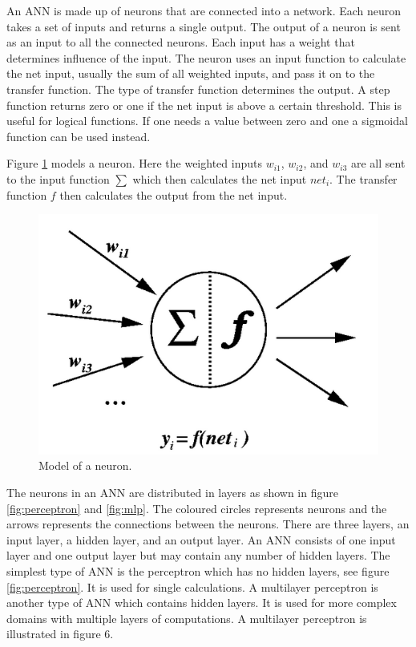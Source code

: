 An ANN is made up of neurons that are connected into a network. Each neuron takes a set of inputs and returns a single output. The output of a neuron is sent as an input to all the connected neurons. Each input has a weight that determines influence of the input. The neuron uses an input function to calculate the net input, usually the sum of all weighted inputs, and pass it on to the transfer function. The type of transfer function determines the output. A step function returns zero or one if the net input is above a certain threshold. This is useful for logical functions. If one needs a value between zero and one a sigmoidal function can be used instead.

Figure \ref{fig:neuron} models a neuron. Here the weighted inputs $w_{i1}$, $w_{i2}$, and $w_{i3}$ are all sent to the input function $\sum$ which then calculates the net input $net_{i}$. The transfer function $f$ then calculates the output from the net input.

\begin{figure}[H]
  \center
    \includegraphics[scale=0.4]{images/nn/neuron.png}
  \caption{Model of a neuron.\cite{neuron} \label{fig:neuron}}
\end{figure}

The neurons in an ANN are distributed in layers as shown in figure \ref{fig:perceptron} and \ref{fig:mlp}. The coloured circles represents neurons and the arrows represents the connections between the neurons. There are three layers, an input layer, a hidden layer, and an output layer. An ANN consists of one input layer and one output layer but may contain any number of hidden layers. The simplest type of ANN is the perceptron which has no hidden layers, see figure \ref{fig:perceptron}. It is used for single calculations. A multilayer perceptron is another type of ANN which contains hidden layers. It is used for more complex domains with multiple layers of computations. A multilayer perceptron is illustrated in figure 6.

